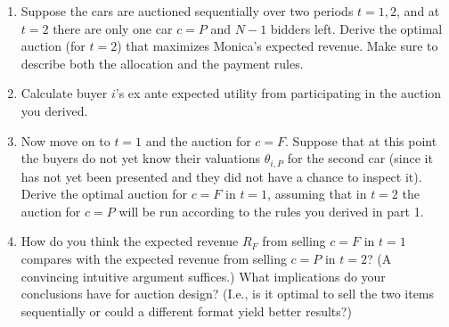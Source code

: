 \documentclass[a4paper]{article}
\newif\ifsolutions
\begin{document}
	\begin{enumerate}
		\item Suppose the cars are auctioned sequentially over two periods $t=1,2$, and at $t=2$ there are only one car $c=P$ and $N-1$ bidders left. Derive the optimal auction (for $t=2$) that maximizes Monica's expected revenue. Make sure to describe both the allocation and the payment rules.
		
		\item Calculate buyer $i$'s ex ante expected utility from participating in the auction you derived.
		
		\item Now move on to $t=1$ and the auction for $c=F$. Suppose that at this point the buyers do not yet know their valuations $\theta_{i,P}$ for the second car (since it has not yet been presented and they did not have a chance to inspect it). Derive the optimal auction for $c=F$ in $t=1$, assuming that in $t=2$ the auction for $c=P$ will be run according to the rules you derived in part 1.
		
		\item How do you think the expected revenue $R_F$ from selling $c=F$ in $t=1$ compares with the expected revenue from selling $c=P$ in $t=2$? (A convincing intuitive argument suffices.) What implications do your conclusions have for auction design? (I.e., is it optimal to sell the two items sequentially or could a different format yield better results?)
	\end{enumerate}
	
	
	
	\ifsolutions
\end{document}
